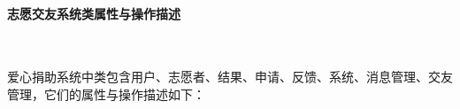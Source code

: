 \paragraph{志愿交友系统类属性与操作描述}~{}

爱心捐助系统中类包含用户、志愿者、结果、申请、反馈、系统、消息管理、交友管理，它们的属性与操作描述如下：







\newpage
